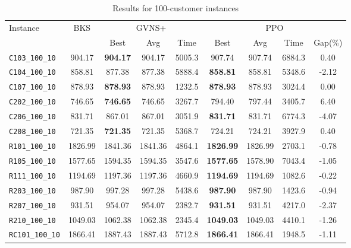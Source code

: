 \begin{table}[ht]
\centering
\small
\setlength{\tabcolsep}{5pt}
\caption{Results for 100-customer instances}
\vspace{4mm}
\begin{adjustbox}{width=\textwidth}
\begin{tabular}{l c c c c @{\hspace{8pt}} c c c c @{\hspace{8pt}}}
\toprule
\multirow{2}{*}{Instance} & \multirow{2}{*}{BKS} & \multicolumn{3}{c}{GVNS+} & \multicolumn{4}{c}{PPO} \\
\cmidrule(lr){3-5} \cmidrule(lr){6-9}
 &  & Best & Avg & Time & Best & Avg & Time & Gap(\%) \\
\midrule
\texttt{C103\_100\_10} & 904.17 & \textbf{904.17} & 904.17 & 5005.3 & 907.74 & 907.74 & 6884.3 & 0.40 \\
\texttt{C104\_100\_10} & 858.81 & 877.38 & 877.38 & 5888.4 & \textbf{858.81} & 858.81 & 5348.6 & -2.12 \\
\texttt{C107\_100\_10} & 878.93 & \textbf{878.93} & 878.93 & 1232.5 & \textbf{878.93} & 878.93 & 3024.4 & 0.00 \\
\texttt{C202\_100\_10} & 746.65 & \textbf{746.65} & 746.65 & 3267.7 & 794.40 & 797.44 & 3405.7 & 6.40 \\
\texttt{C206\_100\_10} & 831.71 & 867.01 & 867.01 & 3051.9 & \textbf{831.71} & 831.71 & 6774.3 & -4.07 \\
\texttt{C208\_100\_10} & 721.35 & \textbf{721.35} & 721.35 & 5368.7 & 724.21 & 724.21 & 3927.9 & 0.40 \\
\texttt{R101\_100\_10} & 1826.99 & 1841.36 & 1841.36 & 4864.1 & \textbf{1826.99} & 1826.99 & 2703.1 & -0.78 \\
\texttt{R105\_100\_10} & 1577.65 & 1594.35 & 1594.35 & 3547.6 & \textbf{1577.65} & 1578.90 & 7043.4 & -1.05 \\
\texttt{R111\_100\_10} & 1194.69 & 1197.36 & 1197.36 & 4660.9 & \textbf{1194.69} & 1194.69 & 1082.6 & -0.22 \\
\texttt{R203\_100\_10} & 987.90 & 997.28 & 997.28 & 5438.6 & \textbf{987.90} & 987.90 & 1423.6 & -0.94 \\
\texttt{R207\_100\_10} & 931.51 & 954.07 & 954.07 & 2382.7 & \textbf{931.51} & 931.51 & 4217.0 & -2.37 \\
\texttt{R210\_100\_10} & 1049.03 & 1062.38 & 1062.38 & 2345.4 & \textbf{1049.03} & 1049.03 & 4410.1 & -1.26 \\
\texttt{RC101\_100\_10} & 1866.41 & 1887.43 & 1887.43 & 5712.8 & \textbf{1866.41} & 1866.41 & 1948.5 & -1.11 \\

\end{tabular}
\end{adjustbox}
\end{table}

